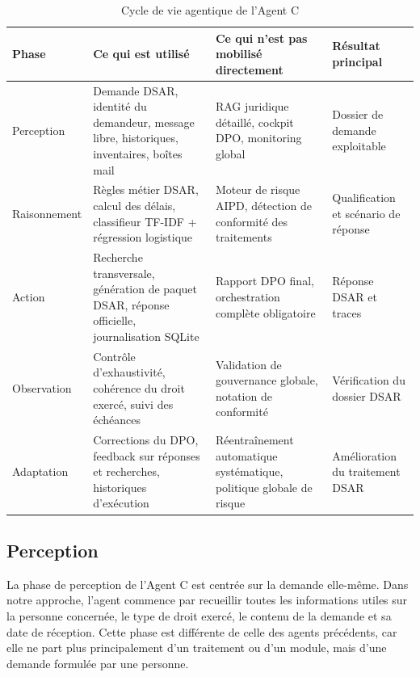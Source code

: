 \documentclass[12pt,a4paper]{report}
\begin{document}
\begin{table}[H]
\centering
\caption{Cycle de vie agentique de l'Agent C}
\label{tab:cycle_agent_c}
\begin{tabularx}{\textwidth}{|p{2.2cm}|X|X|X|}
\hline
\textbf{Phase} & \textbf{Ce qui est utilisé} & \textbf{Ce qui n'est pas mobilisé directement} & \textbf{Résultat principal} \\
\hline
Perception & Demande DSAR, identité du demandeur, message libre, historiques, inventaires, boîtes mail & RAG juridique détaillé, cockpit DPO, monitoring global & Dossier de demande exploitable \\
\hline
Raisonnement & Règles métier DSAR, calcul des délais, classifieur TF-IDF + régression logistique & Moteur de risque AIPD, détection de conformité des traitements & Qualification et scénario de réponse \\
\hline
Action & Recherche transversale, génération de paquet DSAR, réponse officielle, journalisation SQLite & Rapport DPO final, orchestration complète obligatoire & Réponse DSAR et traces \\
\hline
Observation & Contrôle d'exhaustivité, cohérence du droit exercé, suivi des échéances & Validation de gouvernance globale, notation de conformité & Vérification du dossier DSAR \\
\hline
Adaptation & Corrections du DPO, feedback sur réponses et recherches, historiques d'exécution & Réentraînement automatique systématique, politique globale de risque & Amélioration du traitement DSAR \\
\hline
\end{tabularx}
\end{table}

\subsection{Perception}

La phase de perception de l'Agent C est centrée sur la demande elle-même. Dans notre approche, l'agent commence par recueillir toutes les informations utiles sur la personne concernée, le type de droit exercé, le contenu de la demande et sa date de réception. Cette phase est différente de celle des agents précédents, car elle ne part plus principalement d'un traitement ou d'un module, mais d'une demande formulée par une personne.
\end{document}
